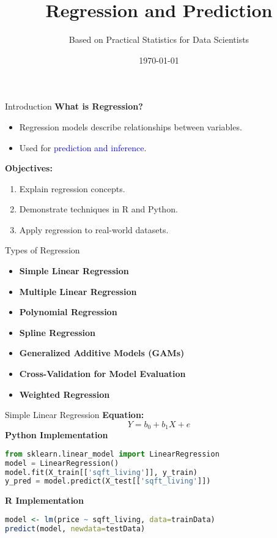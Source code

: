 \documentclass{beamer}
\title{Regression and Prediction}
\author{Based on Practical Statistics for Data Scientists}
\date{\today}
\begin{document}
\begin{frame}
    \titlepage
\end{frame}

\begin{frame}{Introduction}
    \textbf{What is Regression?}
    \begin{itemize}
        \item Regression models describe relationships between variables.
        \item Used for \textcolor{blue}{prediction and inference}.
    \end{itemize}
    \textbf{Objectives:}
    \begin{enumerate}
        \item Explain regression concepts.
        \item Demonstrate techniques in R and Python.
        \item Apply regression to real-world datasets.
    \end{enumerate}
\end{frame}

\begin{frame}{Types of Regression}
    \begin{itemize}
        \item \textbf{Simple Linear Regression}
        \item \textbf{Multiple Linear Regression}
        \item \textbf{Polynomial Regression}
        \item \textbf{Spline Regression}
        \item \textbf{Generalized Additive Models (GAMs)}
        \item \textbf{Cross-Validation for Model Evaluation}
        \item \textbf{Weighted Regression}
    \end{itemize}
\end{frame}

\begin{frame}[fragile]{Simple Linear Regression}
    \textbf{Equation:}
    \[
    Y = b_0 + b_1 X + e
    \]
    \textbf{Python Implementation}
    \begin{lstlisting}[language=Python]
from sklearn.linear_model import LinearRegression
model = LinearRegression()
model.fit(X_train[['sqft_living']], y_train)
y_pred = model.predict(X_test[['sqft_living']])
    \end{lstlisting}
    \textbf{R Implementation}
    \begin{lstlisting}[language=R]
model <- lm(price ~ sqft_living, data=trainData)
predict(model, newdata=testData)
    \end{lstlisting}
\end{frame}
\end{document}
